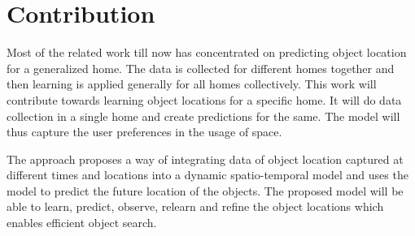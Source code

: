 

\section{Contribution}
\label{sec:contri}
Most of the related work till now has concentrated on predicting object location for a generalized home. The data is collected for different homes together and then learning is applied generally for all homes collectively.  This work will contribute towards learning object locations for a specific home. It will do data collection in a single home and create predictions for the same. The model will thus capture the user preferences in the usage of space.

The approach proposes a way of integrating data of object location captured at
different times and locations into a dynamic spatio-temporal model and uses the
model to predict the future location of the objects. The proposed model will be
able to learn, predict, observe, relearn and refine the object locations which
enables efficient object search.


